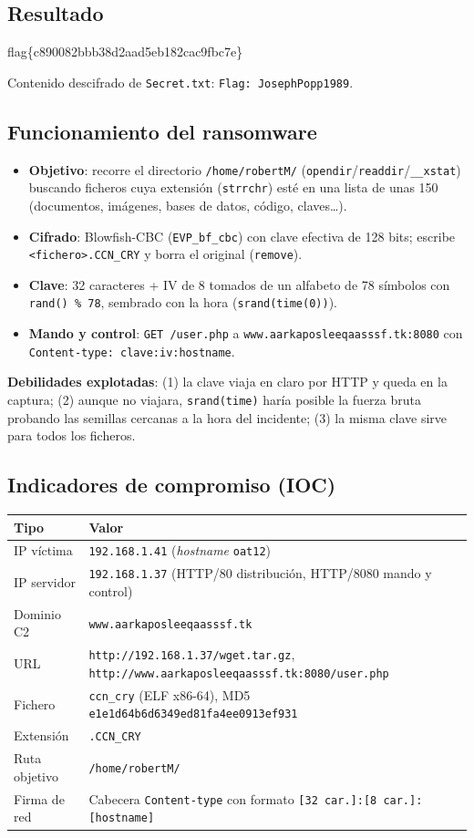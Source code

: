 \documentclass[11pt,a4paper]{article}
\newcommand{\flagbox}[2]{\begin{tcolorbox}[enhanced, colback=flagbg, colframe=green!45!black, boxrule=0.8pt, arc=3pt,
  fonttitle=\bfseries, title={#1}, halign=center]{\Large\ttfamily #2}\end{tcolorbox}}
\begin{document}
\subsection{Resultado}
\flagbox{Flag de CCN-Cry (validada)}{flag\{c890082bbb38d2aad5eb182cac9fbc7e\}}
Contenido descifrado de \texttt{Secret.txt}: \texttt{Flag: JosephPopp1989}.

\subsection{Funcionamiento del ransomware}
\begin{itemize}
  \item \textbf{Objetivo}: recorre el directorio \texttt{/home/robertM/} (\texttt{opendir}/\texttt{readdir}/\texttt{\_\_xstat})
        buscando ficheros cuya extensión (\texttt{strrchr}) esté en una lista de unas 150 (documentos, imágenes,
        bases de datos, código, claves\dots).
  \item \textbf{Cifrado}: Blowfish-CBC (\texttt{EVP\_bf\_cbc}) con clave efectiva de 128 bits; escribe
        \texttt{<fichero>.CCN\_CRY} y borra el original (\texttt{remove}).
  \item \textbf{Clave}: 32 caracteres + IV de 8 tomados de un alfabeto de 78 símbolos con \texttt{rand() \% 78},
        sembrado con la hora (\texttt{srand(time(0))}).
  \item \textbf{Mando y control}: \texttt{GET /user.php} a \texttt{www.aarkaposleeqaasssf.tk:8080} con
        \texttt{Content-type: clave:iv:hostname}.
\end{itemize}

\textbf{Debilidades explotadas}: (1) la clave viaja en claro por HTTP y queda en la captura; (2) aunque no viajara,
\texttt{srand(time)} haría posible la fuerza bruta probando las semillas cercanas a la hora del incidente; (3) la
misma clave sirve para todos los ficheros.

\subsection{Indicadores de compromiso (IOC)}
\begin{tabularx}{\linewidth}{@{}lX@{}}
\toprule
\textbf{Tipo} & \textbf{Valor} \\ \midrule
IP víctima & \texttt{192.168.1.41} (\emph{hostname} \texttt{oat12}) \\
IP servidor & \texttt{192.168.1.37} (HTTP/80 distribución, HTTP/8080 mando y control) \\
Dominio C2 & \texttt{www.aarkaposleeqaasssf.tk} \\
URL & \nolinkurl{http://192.168.1.37/wget.tar.gz}, \nolinkurl{http://www.aarkaposleeqaasssf.tk:8080/user.php} \\
Fichero & \texttt{ccn\_cry} (ELF x86-64), MD5 \texttt{e1e1d64b6d6349ed81fa4ee0913ef931} \\
Extensión & \texttt{.CCN\_CRY} \\
Ruta objetivo & \texttt{/home/robertM/} \\
Firma de red & Cabecera \texttt{Content-type} con formato \texttt{[32 car.]:[8 car.]:[hostname]} \\
\bottomrule
\end{tabularx}
\end{document}
